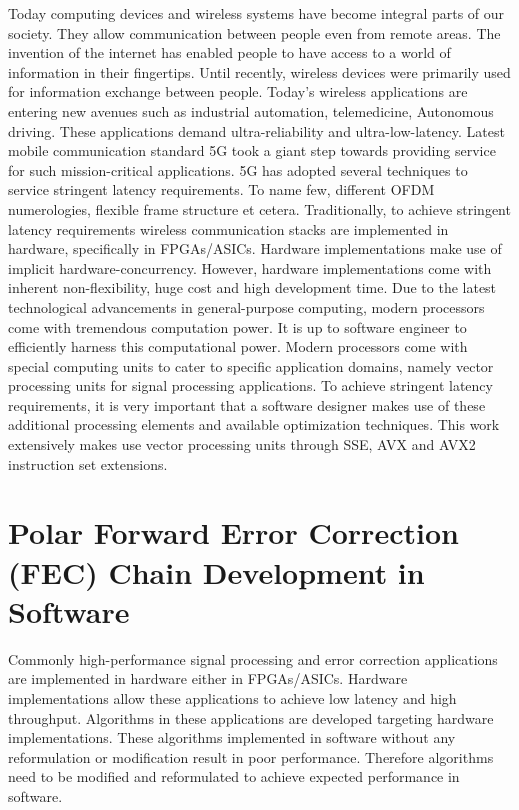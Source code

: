 Today computing devices and wireless systems have become integral parts of our society. They allow communication between people even from remote areas. The invention of the internet has enabled people to have access to a world of information in their fingertips. Until recently, wireless devices were primarily used for information exchange between people. Today's wireless applications are entering new avenues such as industrial automation, telemedicine, Autonomous driving. These applications demand ultra-reliability and ultra-low-latency. Latest mobile communication standard 5G took a giant step towards providing service for such mission-critical applications. 5G has adopted several techniques to service stringent latency requirements. To name few, different OFDM numerologies, flexible frame structure et cetera. Traditionally, to achieve stringent latency requirements wireless communication stacks are implemented in hardware, specifically in FPGAs/ASICs. Hardware implementations make use of implicit hardware-concurrency. However, hardware implementations come with inherent non-flexibility, huge cost and high development time. Due to the latest technological advancements in general-purpose computing, modern processors come with tremendous computation power. It is up to software engineer to efficiently harness this computational power. Modern processors come with special computing units to cater to specific application domains, namely vector processing units for signal processing applications. To achieve stringent latency requirements, it is very important that a software designer makes use of these additional processing elements and available optimization techniques. This work extensively makes use vector processing units through SSE, AVX and AVX2 instruction set extensions.

%
%

\section{Polar Forward Error Correction (FEC) Chain Development in Software}
Commonly high-performance signal processing and error correction applications are implemented in hardware either in FPGAs/ASICs. Hardware implementations allow these applications to achieve low latency and high throughput. Algorithms in these applications are developed targeting hardware implementations. These algorithms implemented in software without any reformulation or modification result in poor performance. Therefore algorithms need to be modified and reformulated to achieve expected performance in software. \newline

